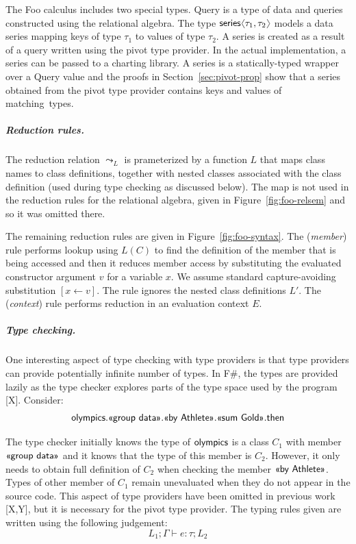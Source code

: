 \documentclass[a4paper,UKenglish]{lipics-v2016}
\theoremstyle{plain}
\theoremstyle{definition}
\newcommand{\langl}{\begin{picture}(4.5,7)
\put(1.1,2.5){\rotatebox{60}{\line(1,0){5.5}}}
\put(1.1,2.5){\rotatebox{300}{\line(1,0){5.5}}}
\end{picture}}
\newcommand{\rangl}{\begin{picture}(4.5,7)
\put(.9,2.5){\rotatebox{120}{\line(1,0){5.5}}}
\put(.9,2.5){\rotatebox{240}{\line(1,0){5.5}}}
\end{picture}}
\newcommand{\ident}[1]{\textnormal{\sffamily #1}}
\newcommand{\qident}[1]{\textnormal{\sffamily \guillemotleft #1\guillemotright}}
\begin{document}
The Foo calculus includes two special types. \ident{Query} is a type of data and queries 
constructed using the relational algebra. The type $\ident{series}\langl \tau_1, \tau_2 \rangl$ 
models a data series mapping keys of type $\tau_1$ to values of type $\tau_2$. A series is created 
as a result of a query written using the pivot type provider. In the actual implementation, a series 
can be passed to a charting library. A series is a statically-typed wrapper over a \ident{Query} 
value and the proofs in Section~\ref{sec:pivot-prop} show that a series obtained from the pivot type 
provider contains keys and values of matching~types.

\subparagraph{Reduction rules.} The reduction relation $\leadsto_L$ is prameterized by a function
$L$ that maps class names to class definitions, together with nested classes associated with the
class definition (used during type checking as discussed below). The map is not used in the 
reduction rules for the relational algebra, given in Figure~\ref{fig:foo-relsem} and so it was 
omitted there.

The remaining reduction rules are given in Figure~\ref{fig:foo-syntax}. The (\emph{member}) rule 
performs lookup using $L(C)$ to find the definition of the member that is being accessed and then
it reduces member access by substituting the evaluated constructor argument $v$ for a variable $x$.
We assume standard capture-avoiding substitution $[x\leftarrow v]$. The rule ignores the nested 
class definitions $L'$. The (\emph{context}) rule performs reduction in an evaluation context $E$.

\subparagraph{Type checking.} One interesting aspect of type checking with type providers is that
type providers can provide potentially infinite number of types. In F\#, the types are provided 
lazily as the type checker explores parts of the type space used by the program [X]. Consider:
%
\begin{equation*}
\ident{olympics}.\qident{group data}.\qident{by Athlete}.\qident{sum Gold}.\ident{then}
\end{equation*}

\noindent
The type checker initially knows the type of $\ident{olympics}$ is a class $C_1$ with member 
$\qident{group data}$ and it knows that the type of this member is $C_2$. However, it only needs to 
obtain full definition of $C_2$ when checking the member $\qident{by Athlete}$. Types of other 
member of $C_1$ remain unevaluated when they do not appear in the source code. This aspect of type
providers have been omitted in previous work [X,Y], but it is necessary for the pivot type provider.
The typing rules given are written using the following judgement:
%
\begin{equation*}
L_1; \Gamma \vdash e : \tau; L_2
\end{equation*}
\end{document}
